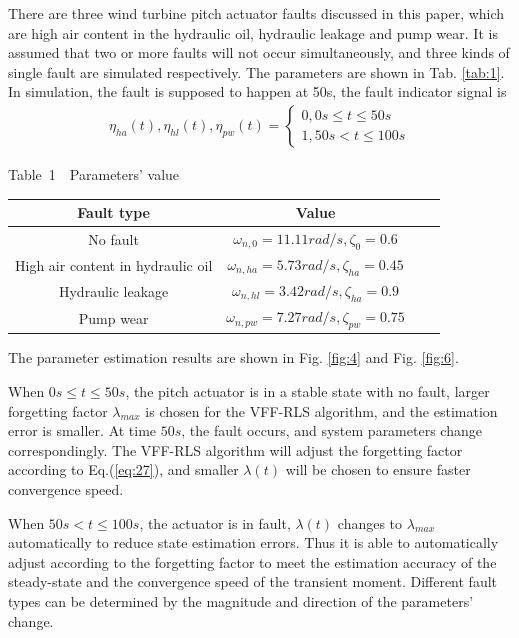 \documentclass{article}
\begin{document}
There are three wind turbine pitch actuator faults discussed in this
paper, which are high air content in the hydraulic oil,
hydraulic leakage and pump wear.
It is assumed that two or more faults will not occur simultaneously,
and three kinds of single fault are simulated respectively.
The parameters are shown in Tab. \ref{tab:1}.
In simulation, the fault is supposed to happen at 50s, the
fault indicator signal is
\begin{eqnarray}
  \eta_{ha}(t),\eta_{hl}(t),\eta_{pw}(t) = \left\{
  \begin{matrix}
  0, 0s\leq{}t\leq50s\\
  1, 50s<{}t\leq100s
  \end{matrix}
  \right.
\end{eqnarray}

\begin{center}
{
Table~1~~Parameters' value}\\
\label{tab:1} \vskip 3pt
\newcommand{\rb}[1]{\raisebox{1.9ex}[-2pt]{#1}}
{
\begin{tabular}{cccc}
    \hline
    Fault type                         & Value                                           \\
    \hline\hline
    No fault                           & $\omega_{n,0}=11.11rad/s, \zeta_0=0.6$          \\
    High air content in hydraulic oil  & $\omega_{n,ha}=5.73rad/s, \zeta_{ha}=0.45$      \\
    Hydraulic leakage                  & $\omega_{n,hl}=3.42rad/s, \zeta_{ha}=0.9$       \\
    Pump wear                          & $\omega_{n,pw}=7.27rad/s, \zeta_{pw}=0.75$      \\
    \hline
\end{tabular}
}
\end{center}


The parameter estimation results are shown in Fig. \ref{fig:4}
and Fig. \ref{fig:6}.


When $0s\leq{}t\leq50s$, the pitch actuator is in a stable state with
no fault, larger forgetting factor $\lambda_{max}$ is chosen for
the VFF-RLS algorithm, and the estimation error is smaller. At time
$50s$, the fault occurs, and system parameters change correspondingly.
The VFF-RLS algorithm will adjust the forgetting factor according to
Eq.(\ref{eq:27}), and smaller $\lambda(t)$ will be chosen to
ensure faster convergence speed.

When $50s<t\leq100s$, the actuator is in fault, $\lambda(t)$ changes to
$\lambda_{max}$ automatically to reduce state estimation errors.
Thus it is able to automatically adjust according to
the forgetting factor  to
meet the estimation accuracy of the steady-state and the
convergence speed of the transient moment.
Different fault types can be determined by the magnitude and
direction of the parameters' change.
\end{document}
